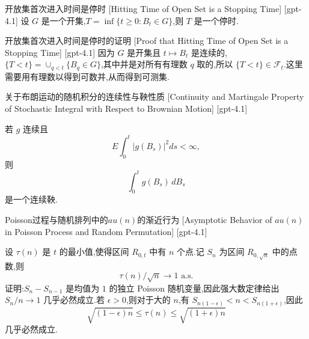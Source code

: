 \documentclass[UTF8]{ctexart}
\begin{document}
    
    
    \begin{thm}
        {开放集首次进入时间是停时}
        [Hitting Time of Open Set is a Stopping Time]
        [gpt-4.1]
        设 $G$ 是一个开集,$T = \operatorname*{inf} \{ t \geq 0 : B_{t} \in G \}$,则 $T$ 是一个停时.
    \end{thm}
    
    
    
    \begin{prf}
        {开放集首次进入时间是停时的证明}
        [Proof that Hitting Time of Open Set is a Stopping Time]
        [gpt-4.1]
        因为 $G$ 是开集且 $t \mapsto B_{t}$ 是连续的,$\{ T < t \} = \cup_{q < t} \{ B_{q} \in G \}$,其中并是对所有有理数 $q$ 取的,所以 $\{ T < t \} \in \mathcal{F}_{t}$.这里需要用有理数以得到可数并,从而得到可测集.
    \end{prf}
    
    
    
    \begin{thm}
        {关于布朗运动的随机积分的连续性与鞅性质}
        [Continuity and Martingale Property of Stochastic Integral with Respect to Brownian Motion]
        [gpt-4.1]
        
若 $g$ 连续且
\[
E\int_0^t |g(B_s)|^2 ds < \infty,
\]
则
\[
\int_0^t g(B_s)\, dB_s
\]
是一个连续鞅.

    \end{thm}
    
    
    
    \begin{lma}
        {Poisson过程与随机排列中的$	au(n)$的渐近行为}
        [Asymptotic Behavior of $	au(n)$ in Poisson Process and Random Permutation]
        [gpt-4.1]
        
设 $\tau(n)$ 是 $t$ 的最小值,使得区间 $R_{0, t}$ 中有 $n$ 个点.记 $S_n$ 为区间 $R_{0, \sqrt{n}}$ 中的点数,则
\[
\tau(n) / \sqrt{n} \to 1 \text{ a.s.}
\]
证明:$S_n - S_{n-1}$ 是均值为 $1$ 的独立 Poisson 随机变量,因此强大数定律给出 $S_n / n \to 1$ 几乎必然成立.若 $\epsilon > 0$,则对于大的 $n$,有 $S_{n (1 - \epsilon)} < n < S_{n (1 + \epsilon)}$,因此
\[
\sqrt{(1 - \epsilon)n} \leq \tau(n) \leq \sqrt{(1 + \epsilon)n}
\]
几乎必然成立.

    \end{lma}
    
\end{document}

